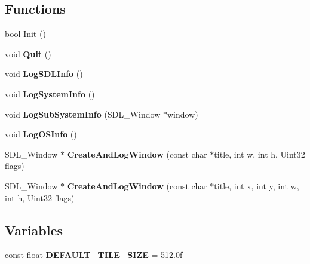 \subsection*{Functions}
\begin{DoxyCompactItemize}
\item 
bool \hyperlink{namespace_z_e_g_l_a2532f9e624be5cdf7898893a8ed3beb5}{Init} ()
\item 
\hypertarget{namespace_z_e_g_l_ac2c7a1737692877ad76697a69cf537e5}{}void {\bfseries Quit} ()\label{namespace_z_e_g_l_ac2c7a1737692877ad76697a69cf537e5}

\item 
\hypertarget{namespace_z_e_g_l_a0a2ded953044c4b444be741c7e2df2a2}{}void {\bfseries Log\+S\+D\+L\+Info} ()\label{namespace_z_e_g_l_a0a2ded953044c4b444be741c7e2df2a2}

\item 
\hypertarget{namespace_z_e_g_l_a38968dd1324a1df01bb2eeefddb94396}{}void {\bfseries Log\+System\+Info} ()\label{namespace_z_e_g_l_a38968dd1324a1df01bb2eeefddb94396}

\item 
\hypertarget{namespace_z_e_g_l_a7cc637f694bcda7c8bca91e4b8befa86}{}void {\bfseries Log\+Sub\+System\+Info} (S\+D\+L\+\_\+\+Window $\ast$window)\label{namespace_z_e_g_l_a7cc637f694bcda7c8bca91e4b8befa86}

\item 
\hypertarget{namespace_z_e_g_l_a03256a2698fec5ffb6985205c4c9a32e}{}void {\bfseries Log\+O\+S\+Info} ()\label{namespace_z_e_g_l_a03256a2698fec5ffb6985205c4c9a32e}

\item 
\hypertarget{namespace_z_e_g_l_a22a7ea2af1dd5aa5fdcfe38fabcb616f}{}S\+D\+L\+\_\+\+Window $\ast$ {\bfseries Create\+And\+Log\+Window} (const char $\ast$title, int w, int h, Uint32 flags)\label{namespace_z_e_g_l_a22a7ea2af1dd5aa5fdcfe38fabcb616f}

\item 
\hypertarget{namespace_z_e_g_l_a62502e9b394f9879403c71aafdb8e166}{}S\+D\+L\+\_\+\+Window $\ast$ {\bfseries Create\+And\+Log\+Window} (const char $\ast$title, int x, int y, int w, int h, Uint32 flags)\label{namespace_z_e_g_l_a62502e9b394f9879403c71aafdb8e166}

\end{DoxyCompactItemize}
\subsection*{Variables}
\begin{DoxyCompactItemize}
\item 
\hypertarget{namespace_z_e_g_l_a602be510f970fe1ad0f68867132e27af}{}const float {\bfseries D\+E\+F\+A\+U\+L\+T\+\_\+\+T\+I\+L\+E\+\_\+\+S\+I\+Z\+E} = 512.\+0f\label{namespace_z_e_g_l_a602be510f970fe1ad0f68867132e27af}

\end{DoxyCompactItemize}


